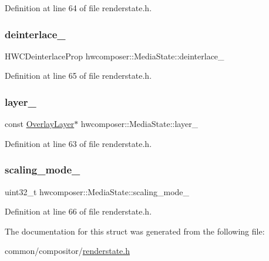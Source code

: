 Definition at line 64 of file renderstate.\+h.

\mbox{\label{structhwcomposer_1_1MediaState_a9326ae6dea06def21b8aba4bb4500002}} 
\subsubsection{\texorpdfstring{deinterlace\+\_\+}{deinterlace\_}}
{\footnotesize\ttfamily H\+W\+C\+Deinterlace\+Prop hwcomposer\+::\+Media\+State\+::deinterlace\+\_\+}



Definition at line 65 of file renderstate.\+h.

\mbox{\label{structhwcomposer_1_1MediaState_a43e040e443a44a8c5ac653f49be17dca}} 
\subsubsection{\texorpdfstring{layer\+\_\+}{layer\_}}
{\footnotesize\ttfamily const \mbox{\hyperlink{structhwcomposer_1_1OverlayLayer}{Overlay\+Layer}}$\ast$ hwcomposer\+::\+Media\+State\+::layer\+\_\+}



Definition at line 63 of file renderstate.\+h.

\mbox{\label{structhwcomposer_1_1MediaState_addeecd9addfdd71066eac26d6ef270c3}} 
\subsubsection{\texorpdfstring{scaling\+\_\+mode\+\_\+}{scaling\_mode\_}}
{\footnotesize\ttfamily uint32\+\_\+t hwcomposer\+::\+Media\+State\+::scaling\+\_\+mode\+\_\+}



Definition at line 66 of file renderstate.\+h.



The documentation for this struct was generated from the following file\+:\begin{DoxyCompactItemize}
\item 
common/compositor/\mbox{\hyperlink{renderstate_8h}{renderstate.\+h}}\end{DoxyCompactItemize}
